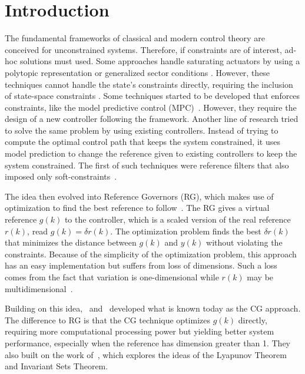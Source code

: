 
\chapter{Introduction}%
\label{chp:introduction}

The fundamental frameworks of classical and modern control theory are conceived
for unconstrained systems. Therefore, if constraints are of interest, ad-hoc
solutions must used. Some approaches handle saturating actuators by using a
polytopic representation or generalized sector conditions \citep{Tar+11}.
However, these techniques cannot handle the state's constraints directly,
requiring the inclusion of state-space constraints \citep{Klug2015}. Some
techniques started to be developed that enforces constraints, like the model
predictive control (MPC)~\citep{article:zhang,book:wang}. However, they require
the design of a new controller following the framework. Another line of research
tried to solve the same problem by using existing controllers. Instead of trying
to compute the optimal control path that keeps the system constrained, it uses
model prediction to change the reference given to existing controllers to keep
the system constrained. The first of such techniques were reference filters that
also imposed only soft-constraints~\citep{Vahidi2007}.

The idea then evolved into Reference Governors (RG), which makes use of
optimization to find the best reference to follow~\citep{Gilbert1995}. The RG
gives a virtual reference \(g(k)\) to the controller, which is a scaled version
of the real reference \(r(k)\), read \(g(k)=\delta r(k)\). The optimization problem
finds the best \(\delta r(k)\) that minimizes the distance between \(g(k)\) and
\(y(k)\) without violating the constraints. Because of the simplicity of the
optimization problem, this approach has an easy implementation but suffers from
loss of dimensions. Such a loss comes from the fact that variation is
one-dimensional while \(r(k)\) may be multidimensional~\citep{Gilbert1999}.

Building on this idea,~\citet{Bemporad1997} and~\citet{Casavola2000} developed
what is known today as the \ac{CG} approach. The difference to RG is that the CG
technique optimizes \(g(k)\) directly, requiring more computational processing
power but yielding better system performance, especially when the reference has
dimension greater than 1. They also built on the work of~\citet{Kapasouris1988},
which explores the ideas of the Lyapunov Theorem and Invariant Sets Theorem.

